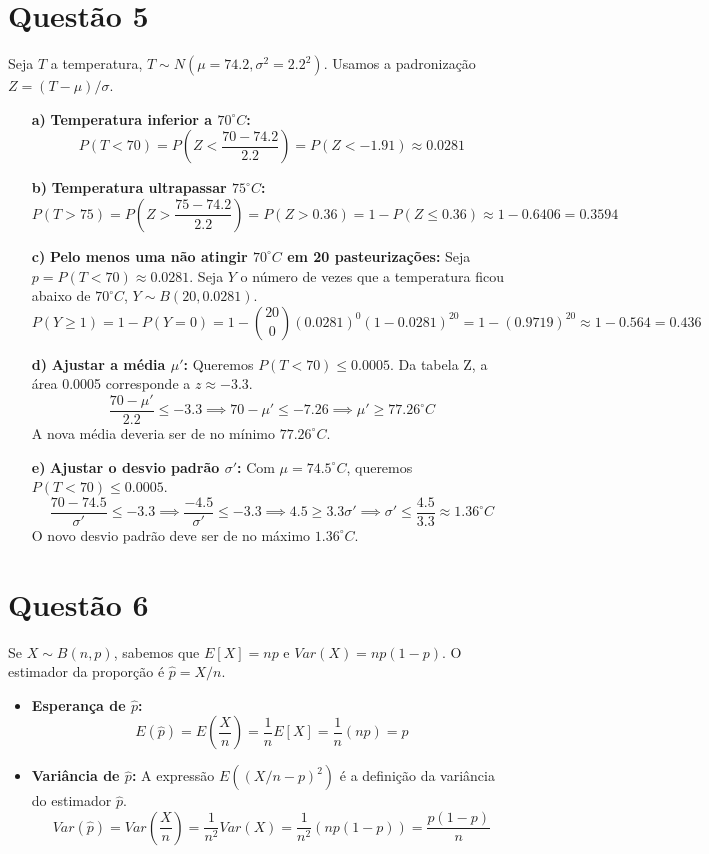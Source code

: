 \documentclass[12pt, a4paper]{article}
\begin{document}
\section*{Questão 5}
Seja $T$ a temperatura, $T \sim N(\mu=74.2, \sigma^2=2.2^2)$. Usamos a padronização $Z = (T-\mu)/\sigma$.
\begin{itemize}
    \item[\textbf{a)}] \textbf{Temperatura inferior a $70^{\circ}C$:}
    $$ P(T < 70) = P\left(Z < \frac{70 - 74.2}{2.2}\right) = P(Z < -1.91) \approx 0.0281 $$
    \item[\textbf{b)}] \textbf{Temperatura ultrapassar $75^{\circ}C$:}
    $$ P(T > 75) = P\left(Z > \frac{75 - 74.2}{2.2}\right) = P(Z > 0.36) = 1 - P(Z \le 0.36) \approx 1 - 0.6406 = 0.3594 $$
    \item[\textbf{c)}] \textbf{Pelo menos uma não atingir $70^{\circ}C$ em 20 pasteurizações:} Seja $p = P(T < 70) \approx 0.0281$. Seja $Y$ o número de vezes que a temperatura ficou abaixo de $70^{\circ}C$, $Y \sim B(20, 0.0281)$.
    $$ P(Y \ge 1) = 1 - P(Y=0) = 1 - \binom{20}{0}(0.0281)^0(1-0.0281)^{20} = 1 - (0.9719)^{20} \approx 1 - 0.564 = 0.436 $$
    \item[\textbf{d)}] \textbf{Ajustar a média $\mu'$:} Queremos $P(T < 70) \le 0.0005$. Da tabela Z, a área 0.0005 corresponde a $z \approx -3.3$.
    $$ \frac{70 - \mu'}{2.2} \le -3.3 \implies 70 - \mu' \le -7.26 \implies \mu' \ge 77.26^{\circ}C $$
    A nova média deveria ser de no mínimo $77.26^{\circ}C$.
    \item[\textbf{e)}] \textbf{Ajustar o desvio padrão $\sigma'$:} Com $\mu = 74.5^{\circ}C$, queremos $P(T < 70) \le 0.0005$.
    $$ \frac{70 - 74.5}{\sigma'} \le -3.3 \implies \frac{-4.5}{\sigma'} \le -3.3 \implies 4.5 \ge 3.3\sigma' \implies \sigma' \le \frac{4.5}{3.3} \approx 1.36^{\circ}C $$
    O novo desvio padrão deve ser de no máximo $1.36^{\circ}C$.
\end{itemize}

\section*{Questão 6}
Se $X \sim B(n,p)$, sabemos que $E[X]=np$ e $Var(X)=np(1-p)$. O estimador da proporção é $\hat{p} = X/n$.
\begin{itemize}
    \item \textbf{Esperança de $\hat{p}$:}
    $$ E(\hat{p}) = E\left(\frac{X}{n}\right) = \frac{1}{n}E[X] = \frac{1}{n}(np) = p $$
    \item \textbf{Variância de $\hat{p}$:} A expressão $E((X/n - p)^2)$ é a definição da variância do estimador $\hat{p}$.
    $$ Var(\hat{p}) = Var\left(\frac{X}{n}\right) = \frac{1}{n^2}Var(X) = \frac{1}{n^2}(np(1-p)) = \frac{p(1-p)}{n} $$
\end{itemize}
\end{document}
